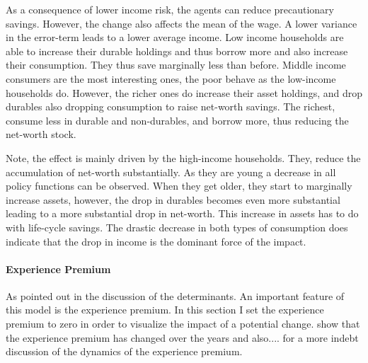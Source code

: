 \documentclass[a4paper,12pt,legno]{article}
\begin{document}
As a consequence of lower income risk, the agents can reduce precautionary savings. However, the change also affects the mean of the wage. A lower variance in the error-term leads to a lower average income. 
Low income households are able to increase their durable holdings and thus borrow more and also increase their consumption. They thus save marginally less than before. Middle income consumers are the most interesting ones, the poor behave as the low-income households do. However, the richer ones do increase their asset holdings, and drop durables also dropping consumption to raise net-worth savings. The richest, consume less in durable and non-durables, and borrow more, thus reducing the net-worth stock. 

Note, the effect is mainly driven by the high-income households. They, reduce the accumulation of net-worth substantially. As they are young a decrease in all policy functions can be observed. When they get older, they start to marginally increase assets, however, the drop in durables becomes even more substantial leading to a more substantial drop in net-worth. This increase in assets has to do with life-cycle savings. The drastic decrease in both types of consumption does indicate that the drop in income is the dominant force of the impact. 

\paragraph{Experience Premium}
As pointed out in the discussion of the determinants. An important feature of this model is the experience premium. In this section I set the experience premium to zero in order to visualize the impact of a potential change. \cite{hintermaier2011} show that the experience premium has changed over the years and also.... for a more indebt discussion of the dynamics of the experience premium. 
\end{document}
